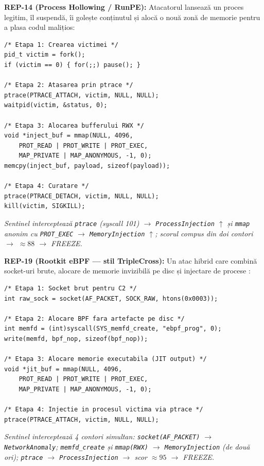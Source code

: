 \par \textbf{REP-14 (Process Hollowing / RunPE):} Atacatorul lansează un proces legitim, îl suspendă, îi golește conținutul și alocă o nouă zonă de memorie pentru a plasa codul malițios:

\begin{lstlisting}[style=cstyle,caption={REP-14: Etapele de golire a procesului (Process Hollowing)}]
/* Etapa 1: Crearea victimei */
pid_t victim = fork();
if (victim == 0) { for(;;) pause(); }

/* Etapa 2: Atasarea prin ptrace */
ptrace(PTRACE_ATTACH, victim, NULL, NULL);
waitpid(victim, &status, 0);

/* Etapa 3: Alocarea bufferului RWX */
void *inject_buf = mmap(NULL, 4096,
    PROT_READ | PROT_WRITE | PROT_EXEC,
    MAP_PRIVATE | MAP_ANONYMOUS, -1, 0);
memcpy(inject_buf, payload, sizeof(payload));

/* Etapa 4: Curatare */
ptrace(PTRACE_DETACH, victim, NULL, NULL);
kill(victim, SIGKILL);
\end{lstlisting}
\par\textit{Sentinel interceptează \texttt{ptrace} (syscall 101) $\rightarrow$ \texttt{ProcessInjection} $\uparrow$ și \texttt{mmap} anonim cu \texttt{PROT\_EXEC} $\rightarrow$ \texttt{MemoryInjection} $\uparrow$; scorul compus din doi contori $\rightarrow$ $\approx 88$ $\rightarrow$ FREEZE.}

\par \textbf{REP-19 (Rootkit eBPF --- stil TripleCross):} Un atac hibrid care combină socket-uri brute, alocare de memorie invizibilă pe disc și injectare de procese \cite{TripleCross2022}:

\begin{lstlisting}[style=cstyle,caption={REP-19: Lanțul de atac eBPF Rootkit}]
/* Etapa 1: Socket brut pentru C2 */
int raw_sock = socket(AF_PACKET, SOCK_RAW, htons(0x0003));

/* Etapa 2: Alocare BPF fara artefacte pe disc */
int memfd = (int)syscall(SYS_memfd_create, "ebpf_prog", 0);
write(memfd, bpf_nop, sizeof(bpf_nop));

/* Etapa 3: Alocare memorie executabila (JIT output) */
void *jit_buf = mmap(NULL, 4096,
    PROT_READ | PROT_WRITE | PROT_EXEC,
    MAP_PRIVATE | MAP_ANONYMOUS, -1, 0);

/* Etapa 4: Injectie in procesul victima via ptrace */
ptrace(PTRACE_ATTACH, victim, NULL, NULL);
\end{lstlisting}
\par\textit{Sentinel interceptează 4 contori simultan: \texttt{socket(AF\_PACKET)} $\rightarrow$ \texttt{NetworkAnomaly}; \texttt{memfd\_create} și \texttt{mmap(RWX)} $\rightarrow$ \texttt{MemoryInjection} (de două ori); \texttt{ptrace} $\rightarrow$ \texttt{ProcessInjection} $\rightarrow$ scor $\approx 95$ $\rightarrow$ FREEZE.}

